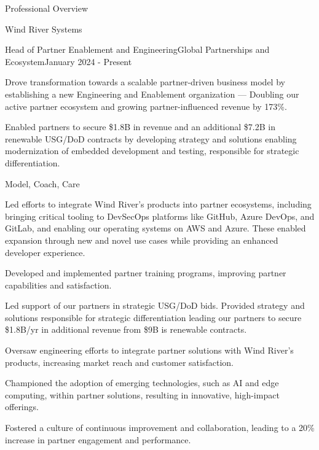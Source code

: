 \documentclass{resume} %
\begin{document}
\begin{rSection}{Professional Overview}
  
  \begin{rCompany}{Wind River Systems}{}{}

    \begin{rSubSubsection}{Head of Partner Enablement and Engineering}{Global Partnerships and Ecosystem}{January 2024 - Present}
      \item Drove transformation towards a scalable partner-driven business model by establishing a new Engineering and Enablement organization --- Doubling our active partner ecosystem and growing partner-influenced revenue by 173\%.
      \item Enabled partners to secure \$1.8B in revenue and an additional \$7.2B in renewable USG/DoD contracts by developing strategy and solutions enabling modernization of embedded development and testing, responsible for strategic differentiation.
      \item Model, Coach, Care
      \item Led efforts to integrate Wind River's products into partner ecosystems, including bringing critical tooling to DevSecOps platforms like GitHub, Azure DevOps, and GitLab, and enabling our operating systems on AWS and Azure. These enabled expansion through new and novel use cases while providing an enhanced developer experience.
      \item Developed and implemented partner training programs, improving partner capabilities and satisfaction.
      
      \item %
      \item Led support of our partners in strategic USG/DoD bids. Provided strategy and solutions  responsible for strategic differentiation leading our partners to secure \$1.8B/yr in additional revenue from \$9B is renewable contracts.
      \item Oversaw engineering efforts to integrate partner solutions with Wind River's products, increasing market reach and customer satisfaction.
      \item Championed the adoption of emerging technologies, such as AI and edge computing, within partner solutions, resulting in innovative, high-impact offerings.
      \item Fostered a culture of continuous improvement and collaboration, leading to a 20\% increase in partner engagement and performance.


\end{rSubSubsection}
\end{rCompany}
\end{rSection}
\end{document}

